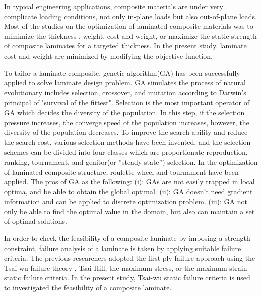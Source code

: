 \documentclass[smallextended]{svjour3}       %
\begin{document}
In typical engineering applications, composite materials are under very
complicate loading conditions, not only in-plane loads but also out-of-plane
loads. Most of the studies on the optimization of laminated composite materials
was to mimimize the thickness \cite{abu1998optimum,walker2003technique},
weight\cite{fang1993design,deka2005multiobjective,park2008improved}, cost and
weight\cite{deka2005multiobjective,omkar2008artificial}, or maximize the static
strength of composite laminates for a targeted
thickness\cite{walker2003technique,lin2004stacking,kim2007development}. In the
present study, laminate cost and weight are minimized by modifying the objective function.

To tailor a laminate composite, genetic algorithm(GA) has been successfully
applied to solve laminate design
problem\cite{riche1993optimization,nagendra1996improved,sadagopan1998application,todoroki1998stacking,liu2000permutation,sivakumar1998optimum,walker2003technique,lin2004stacking,kang2005minimum,murugan2007target,akbulut2008optimum}.
GA simulates the process of natural evolutionary includes selection, crossover, 
and mutation according to Darwin's principal of "survival of the fittest".
Selection is the most important operator  of GA which decides the diversity of
the population.  In this step, if the selection pressure increases, the
converge speed of the population increases, however, the diversity of the
population decreases.  To improve the search ability and reduce the search cost,
various selection methods have been invented, and the selection schemes can be
divided into four classes which are proportionate reproduction, ranking,
tournament, and genitor(or ”steady state”) selection. In the optimization of
laminated composite structure, roulette wheel\cite{riche1993optimization,seresta2007optimal} and
tournament\cite{lin2004stacking} have been applied.
The pros of GA as the following: (i): GAs are not easily trapped in local
optima, and be able to obtain the global optimal. (ii): GA doesn't need
gradient information and can be applied to discrete optimization problem.
(iii): GA not only be able to find the optimal value in the domain, but also
can maintain a set of optimal solutions.


In order to check the feasibility of a composite laminate by imposing a
strength constraint, failure analysis of a laminate is taken by applying
suitable failure criteria. The previous researchers adopted the
first-ply-failure approach using the Tsai-wu failure theory
\cite{massard1984computer,reddy1987first,fang1993design,soeiro1994multilevel,pelletier2006multi,jadhav2007parametric,omkar2008artificial,choudhury2019failure},
Tsai-Hill\cite{martin1987optimum,soares1995discrete}, the maximum
stress\cite{jadhav2007parametric,omkar2008artificial}, or the maximum
strain\cite{watkins1987multicriteria} static failure criteria. In the present
study, Tsai-wu static failure criteria is used to investigated the feasibility
of a composite laminate.
\end{document}
